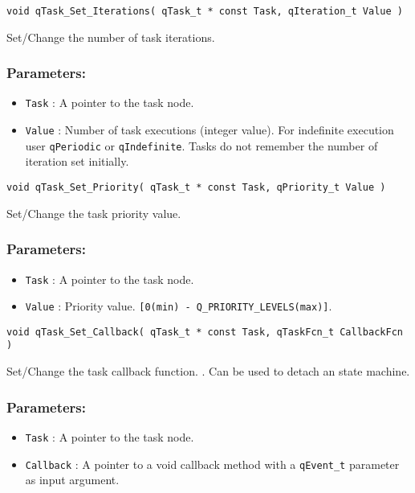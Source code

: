\noindent\hrulefill

\begin{lstlisting}[style=CStyle]
void qTask_Set_Iterations( qTask_t * const Task, qIteration_t Value )
\end{lstlisting}

Set/Change the number of task iterations. 

\subsubsection*{Parameters:}
\begin{itemize}
    \item \lstinline{Task} : A pointer to the task node.
    \item \lstinline{Value} : Number of task executions (integer value). For indefinite execution user \lstinline{qPeriodic} or \lstinline{qIndefinite}. Tasks do not remember the number of iteration set initially. 
\end{itemize}

\noindent\hrulefill


\begin{lstlisting}[style=CStyle]
void qTask_Set_Priority( qTask_t * const Task, qPriority_t Value )
\end{lstlisting}

Set/Change the task priority value. 

\subsubsection*{Parameters:}
\begin{itemize}
    \item \lstinline{Task} : A pointer to the task node.
    \item \lstinline{Value} : Priority value. \lstinline{[0(min) - Q_PRIORITY_LEVELS(max)]}. 
\end{itemize}

\noindent\hrulefill


\begin{lstlisting}[style=CStyle]
void qTask_Set_Callback( qTask_t * const Task, qTaskFcn_t CallbackFcn )
\end{lstlisting}

Set/Change the task callback function. . Can be used to detach an state machine.

\subsubsection*{Parameters:}
\begin{itemize}
    \item \lstinline{Task} : A pointer to the task node.
    \item \lstinline{Callback} : A pointer to a void callback method with a \lstinline{qEvent_t} parameter as input argument.
\end{itemize}


